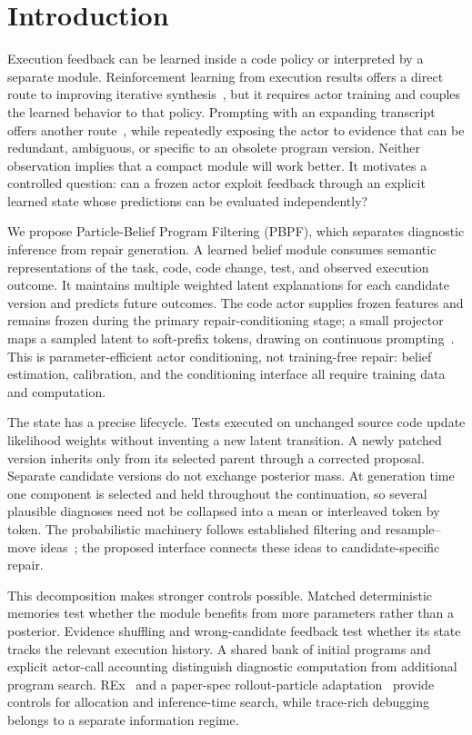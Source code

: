 \section{Introduction}
Execution feedback can be learned inside a code policy or interpreted by a separate module. Reinforcement learning from execution results offers a direct route to improving iterative synthesis~\citep{rlef}, but it requires actor training and couples the learned behavior to that policy. Prompting with an expanding transcript offers another route~\citep{selfdebug}, while repeatedly exposing the actor to evidence that can be redundant, ambiguous, or specific to an obsolete program version. Neither observation implies that a compact module will work better. It motivates a controlled question: can a frozen actor exploit feedback through an explicit learned state whose predictions can be evaluated independently?

We propose Particle-Belief Program Filtering (PBPF), which separates diagnostic inference from repair generation. A learned belief module consumes semantic representations of the task, code, code change, test, and observed execution outcome. It maintains multiple weighted latent explanations for each candidate version and predicts future outcomes. The code actor supplies frozen features and remains frozen during the primary repair-conditioning stage; a small projector maps a sampled latent to soft-prefix tokens, drawing on continuous prompting~\citep{li2021prefix}. This is parameter-efficient actor conditioning, not training-free repair: belief estimation, calibration, and the conditioning interface all require training data and computation.

The state has a precise lifecycle. Tests executed on unchanged source code update likelihood weights without inventing a new latent transition. A newly patched version inherits only from its selected parent through a corrected proposal. Separate candidate versions do not exchange posterior mass. At generation time one component is selected and held throughout the continuation, so several plausible diagnoses need not be collapsed into a mean or interleaved token by token. The probabilistic machinery follows established filtering and resample--move ideas~\citep{delmoral2006,gilks2001}; the proposed interface connects these ideas to candidate-specific repair.

This decomposition makes stronger controls possible. Matched deterministic memories test whether the module benefits from more parameters rather than a posterior. Evidence shuffling and wrong-candidate feedback test whether its state tracks the relevant execution history. A shared bank of initial programs and explicit actor-call accounting distinguish diagnostic computation from additional program search. REx~\citep{rex} and a paper-spec rollout-particle adaptation~\citep{roulette} provide controls for allocation and inference-time search, while trace-rich debugging~\citep{ldb} belongs to a separate information regime.

